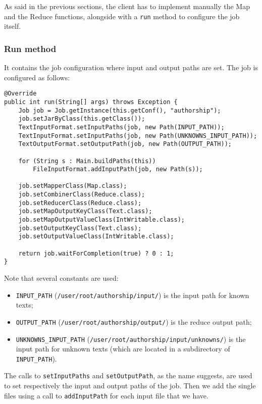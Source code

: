 \documentclass[a4paper,11pt, twoside]{article}
\begin{document}
		\bigskip
		\noindent
		As said in the previous sections, the client has to implement manually the Map and the Reduce functions, alongside with a \lstinline|run| method to configure the job itself.

	\subsubsection{Run method}
		It contains the job configuration where input and output paths are set.
		The job is configured as follows:
	
	\begin{lstlisting}[firstnumber=48, caption={Run method}, captionpos=b]
@Override
public int run(String[] args) throws Exception {
	Job job = Job.getInstance(this.getConf(), "authorship");
	job.setJarByClass(this.getClass());
	TextInputFormat.setInputPaths(job, new Path(INPUT_PATH));
	TextInputFormat.setInputPaths(job, new Path(UNKNOWNS_INPUT_PATH));
	TextOutputFormat.setOutputPath(job, new Path(OUTPUT_PATH));
	
	for (String s : Main.buildPaths(this))
		FileInputFormat.addInputPath(job, new Path(s));
	
	job.setMapperClass(Map.class);
	job.setCombinerClass(Reduce.class);
	job.setReducerClass(Reduce.class);
	job.setMapOutputKeyClass(Text.class);
	job.setMapOutputValueClass(IntWritable.class);
	job.setOutputKeyClass(Text.class);
	job.setOutputValueClass(IntWritable.class);
	
	return job.waitForCompletion(true) ? 0 : 1;
}
	\end{lstlisting}
	
		\noindent
		Note that several constants are used: \begin{itemize}
			\item \lstinline|INPUT_PATH| (\lstinline|/user/root/authorship/input/|) is the input path for known texts;
			\item \lstinline|OUTPUT_PATH| (\lstinline|/user/root/authorship/output/|) is the reduce output path;
			\item \lstinline|UNKNOWNS_INPUT_PATH| (\lstinline|/user/root/authorship/input/unknowns/|) is the input path for unknown texts (which are located in a subdirectory of \lstinline|INPUT_PATH|).
		\end{itemize}

		\noindent
		The calls to \lstinline|setInputPaths| and \lstinline|setOutputPath|, as the name suggests, are used to set respectively the input and output paths of the job. Then we add the single files using a call to \lstinline|addInputPath| for each input file that we have. 
		
\end{document}
